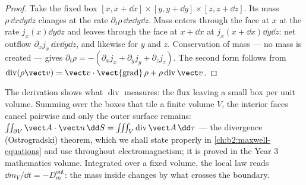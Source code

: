 \begin{proof}
Take the fixed box $[x, x + \dd x]\times[y, y + \dd y]\times[z, z + \dd z]$.
Its mass $\rho\,\dd x\dd y\dd z$ changes at the rate $\partial_t\rho\,\dd x\dd y
\dd z$. Mass enters through the face at $x$ at the rate $j_x(x)\dd y\dd z$
and leaves through the face at $x + \dd x$ at $j_x(x + \dd x)\dd y\dd z$:
net outflow $\partial_xj_x\,\dd x\dd y\dd z$, and likewise for $y$ and $z$.
Conservation of mass --- no mass is created --- gives $\partial_t\rho = -
(\partial_xj_x + \partial_yj_y + \partial_zj_z)$. The second form follows from
$\operatorname{div}(\rho\vect v) = \vect v\cdot\operatorname{\vect{grad}}\rho +
\rho\operatorname{div}\vect v$.
\end{proof}

\begin{remark}\label{rem:b2:fluid-kinematics:divergence}
The derivation shows what $\operatorname{div}$ measures: the flux leaving
a small box per unit volume. Summing over the boxes that tile a finite
volume $V$, the interior faces cancel pairwise and only the outer
surface remains: $\iint_{\partial V}\vect A\cdot\vect n\,\dd S = \iiint_V
\operatorname{div}\vect A\,\dd\tau$ --- the divergence (Ostrogradski)
theorem, which we shall state properly in \cref{ch:b2:maxwell-equations}
and use throughout electromagnetism; it is proved in the Year 3
mathematics volume. Integrated over a fixed volume, the local law reads
$\dd m_V/\dd t = -D_m^{\text{out}}$: the mass inside changes by what
crosses the boundary.
\end{remark}

